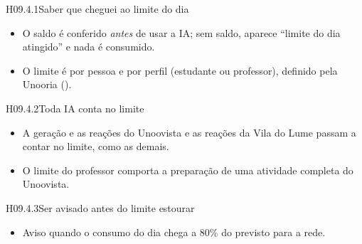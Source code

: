 
\begin{historia}{H09.4.1}{Saber que cheguei ao limite do dia}{\pronto}
\aceite
\begin{itemize}
  \item O saldo é conferido \emph{antes} de usar a IA; sem saldo, aparece
    \enquote{limite do dia atingido} e nada é consumido.
  \item O limite é por pessoa e por perfil (estudante ou professor), definido
    pela Unooria ().
\end{itemize}
\end{historia}

\begin{historia}{H09.4.2}{Toda IA conta no limite}{\afazer}
\aceiteproposta
\begin{itemize}
  \item A geração e as reações do Unoovista e as reações da Vila do Lume
    passam a contar no limite, como as demais.
  \item O limite do professor comporta a preparação de uma atividade completa
    do Unoovista.
\end{itemize}
\end{historia}

\begin{historia}{H09.4.3}{Ser avisado antes do limite estourar}{\afazer}
\aceiteproposta
\begin{itemize}
  \item Aviso quando o consumo do dia chega a 80\% do previsto para a rede.
\end{itemize}
\end{historia}
